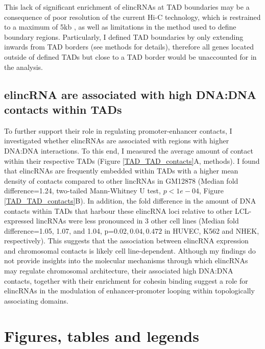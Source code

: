 \documentclass[11pt,a4paper]{report}
\begin{document}
This lack of significant enrichment of elincRNAs at TAD boundaries may be a consequence of poor resolution of the current Hi-C technology, which is restrained to a maximum of 5kb \cite{Rao2014}⁠, as well as limitations in the method used to define boundary regions. Particularly, I defined TAD boundaries by only extending inwards from TAD borders (see methods for details), therefore all genes located outside of defined TADs but close to a TAD border would be unaccounted for in the analysis. 


\subsection*{elincRNA are associated with high DNA:DNA contacts within TADs}

To further support their role in regulating promoter-enhancer contacts, I investigated whether elincRNAs are associated with regions with higher DNA:DNA interactions. To this end, I measured the average amount of contact within their respective TADs (Figure \ref{TAD_TAD_contacts}A, methods). I found that elincRNAs are frequently embedded within TADs with a higher mean density of contacts compared to other lincRNAs in GM12878 (Median fold difference=1.24, two-tailed Mann-Whitney U test, $p<1e-04$, Figure \ref{TAD_TAD_contacts}B). In addition, the fold difference in the amount of DNA contacts within TADs that harbour these elincRNA loci relative to other LCL-expressed lincRNAs were less pronounced in 3 other cell lines (Median fold difference=1.05, 1.07, and 1.04, p=$0.02, 0.04, 0.472$ in HUVEC, K562 and NHEK, respectively). This suggests that the association between elincRNA expression and chromosomal contacts is likely cell line-dependent. 
Although my findings do not provide insights into the molecular mechanisms through which elincRNAs may regulate chromosomal architecture, their associated high DNA:DNA contacts, together with their enrichment for cohesin binding suggest a role for elincRNAs in the modulation of enhancer-promoter looping within topologically associating domains.

\section*{Figures, tables and legends}
\end{document}
